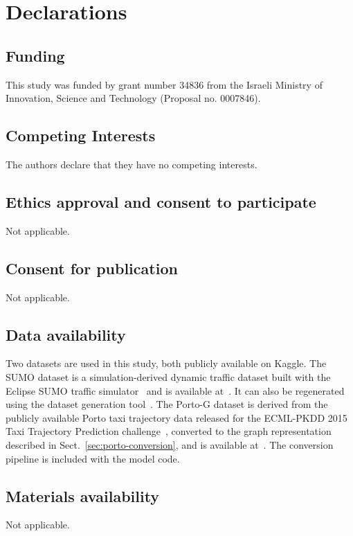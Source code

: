 \section*{Declarations}

\subsection*{Funding}
This study was funded by grant number 34836 from the Israeli Ministry of Innovation, Science and Technology (Proposal no. 0007846).

\subsection*{Competing Interests}
The authors declare that they have no competing interests.

\subsection*{Ethics approval and consent to participate}
Not applicable.

\subsection*{Consent for publication}
Not applicable.

\subsection*{Data availability}
Two datasets are used in this study, both publicly available on Kaggle. The SUMO dataset is a simulation-derived dynamic traffic dataset built with the Eclipse SUMO traffic simulator~\cite{SUMO2018} and is available at~\cite{tordjman2026sumokaggle}. It can also be regenerated using the dataset generation tool~\cite{sumo_data_generator}. The Porto-G dataset is derived from the publicly available Porto taxi trajectory data released for the ECML-PKDD 2015 Taxi Trajectory Prediction challenge~\cite{moreira2013porto}, converted to the graph representation described in Sect.~\ref{sec:porto-conversion}, and is available at~\cite{tordjman2026portokaggle}. The conversion pipeline is included with the model code.

\subsection*{Materials availability}
Not applicable.

